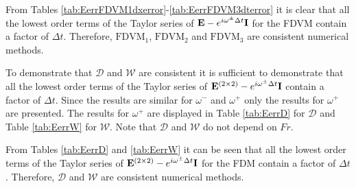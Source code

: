 From Tables \ref{tab:EerrFDVM1dxerror}-\ref{tab:EerrFDVM3dterror} it is clear that all the lowest order terms of the Taylor series of $\mathbf{E}- e^{i\omega^\pm \Delta t } \mathbf{I}$ for the FDVM contain a factor of $\Delta t$. Therefore, $\text{FDVM}_1$, $\text{FDVM}_2$ and $\text{FDVM}_3$ are consistent numerical methods.

To demonstrate that $\mathcal{D}$ and $\mathcal{W}$ are consistent it is sufficient to demonstrate that all the lowest order terms of the Taylor series of $\mathbf{E}^{\left(2\times 2\right)}- e^{i\omega^\pm \Delta t } \mathbf{I}$ contain a factor of $\Delta t$. Since the results are similar for $\omega^-$ and $\omega^+$ only the results for $\omega^+$ are presented. The results for $\omega^+$ are displayed in Table \ref{tab:EerrD} for $\mathcal{D}$ and Table \ref{tab:EerrW} for $\mathcal{W}$. Note that $\mathcal{D}$ and $\mathcal{W}$ do not depend on $Fr$.

From Tables \ref{tab:EerrD} and \ref{tab:EerrW} it can be seen that all the lowest order terms of the Taylor series of $\mathbf{E}^{\left(2\times 2\right)}- e^{i\omega^\pm \Delta t } \mathbf{I}$ for the FDM contain a factor of $\Delta t$. Therefore, $\mathcal{D}$ and $\mathcal{W}$ are consistent numerical methods. 

